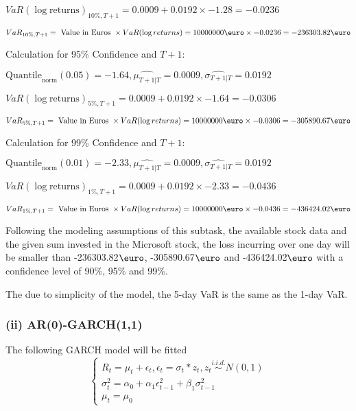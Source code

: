 \indent\indent $VaR(\log \text{returns})_{10\%, T + 1} = 0.0009 + 0.0192\times-1.28 = -0.0236$

\indent\indent $VaR_{10\%, T + 1} = \text{ Value in Euros } \times VaR(\log returns) = 10 000 000 \text{\euro} \times-0.0236 = -236303.82 \text{\euro}$\newline




Calculation for 95\% Confidence and $T+1$:

\indent\indent $\text{Quantile}_\text{norm}(0.05) = -1.64,\hat{\mu_{T+1|T}} = 0.0009, \hat{\sigma_{T+1|T}} = 0.0192$

\indent\indent $VaR(\log \text{returns})_{5\%, T + 1} = 0.0009 + 0.0192\times-1.64 = -0.0306$

\indent\indent $VaR_{5\%, T + 1} = \text{ Value in Euros } \times VaR(\log returns) = 10 000 000 \text{\euro} \times-0.0306 = -305890.67 \text{\euro}$\newline




Calculation for 99\% Confidence and $T+1$:

\indent\indent $\text{Quantile}_\text{norm}(0.01) = -2.33,\hat{\mu_{T+1|T}} = 0.0009, \hat{\sigma_{T+1|T}} = 0.0192$

\indent\indent $VaR(\log \text{returns})_{1\%, T + 1} = 0.0009 + 0.0192\times-2.33 = -0.0436$

\indent\indent $VaR_{1\%, T + 1} = \text{ Value in Euros } \times VaR(\log returns) = 10 000 000 \text{\euro} \times-0.0436 = -436424.02 \text{\euro}$\newline


Following the modeling assumptions of this subtask, the available stock data and the given sum invested in the Microsoft stock, the loss incurring over one day will be smaller than -236303.82$\text{\euro}$, -305890.67$\text{\euro}$  and -436424.02$\text{\euro}$  with a confidence level of 90\%, 95\%  and 99\%.

The due to simplicity of the model, the 5-day VaR is the same as the 1-day VaR.


\subsubsection{(ii) AR(0)-GARCH(1,1)}
 The following GARCH model will be fitted 
$$\begin{cases} R_t = \mu_t + \epsilon_t, \epsilon_t = \sigma_t  * z_t, z_t \overset{i.i.d.}{\sim} N(0,1) \\ \sigma^2_t = \alpha_0 + \alpha_1 \epsilon^2_{t-1} + \beta_1 \sigma^2_{t-1} \\ \mu_t = \mu_0 \end{cases}$$

